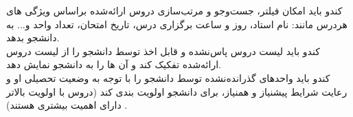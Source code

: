 \documentclass{report}
\begin{document}
                                                                                                                                                                                                                                                                                                                                                                                                                                               \begin{adjustwidth}{2em}{0pt}
                                                                                                                                                                                                                          کندو باید امکان فیلتر، جست‌وجو و مرتب‌سازی دروس ارائه‌شده براساس ویژگی های هردرس مانند: نام استاد، روز و ساعت برگزاری درس، تاریخ امتحان، تعداد واحد و... به دانشجو بدهد. 
                                                                                                                                                                                                                          \\                                                                                                                                                                                                                         کندو باید لیست دروس پاس‌نشده و قابل اخذ توسط دانشجو را از لیست دروس ارائه‌شده تفکیک کند و آن ها را به دانشجو نمایش دهد.  
                                                                                                                                                                                                                          \\
                                                                                                                                                                                                                         کندو باید واحدهای گذرانده‌نشده توسط دانشجو را با توجه به وضعیت تحصیلی او و رعایت شرایط پیشنیاز و همنیاز، برای دانشجو اولویت بندی کند (دروس با اولویت بالاتر دارای اهمیت بیشتری هستند) .
                                                                                                                                                                                                                                                                                                                                                                                                                                                                                                                                                                                                                                                        \end{adjustwidth}  
\end{document}
